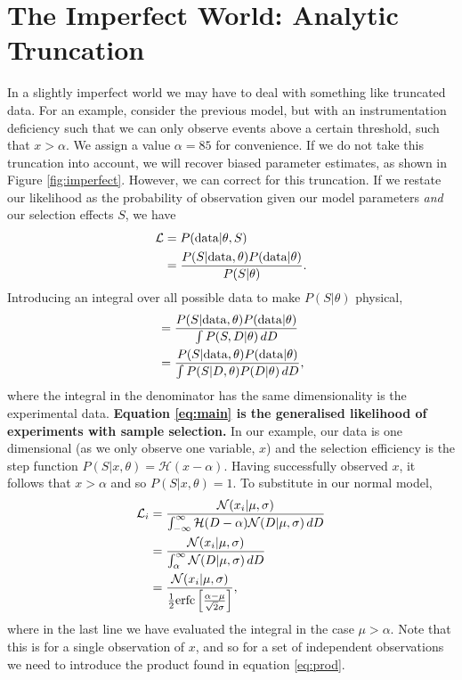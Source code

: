 \documentclass[a4paper,fleqn,usenatbib]{mnras}
\begin{document}
\section{The Imperfect World: Analytic Truncation}
\label{sec:imperfect}
In a slightly imperfect world we may have to deal with something like truncated data. For an example, consider the previous model, but with an instrumentation deficiency such that we can only observe events above a certain threshold, such that $x > \alpha$. We assign a value $\alpha=85$ for convenience. If we do not take this truncation into account, we will recover biased parameter estimates, as shown in Figure \ref{fig:imperfect}. However, we can correct for this truncation. If we restate our likelihood as the probability of observation given our model parameters \textit{and} our selection effects $S$, we have
\begin{align}
\mathcal{L} &= P({\rm data} | \theta, S)\\
&= \frac{P(S|{\rm data},\theta) P({\rm data}|\theta)}{P(S|\theta)}.
\end{align}
Introducing an integral over all possible data to make $P(S|\theta)$ physical,
\begin{align}
&= \frac{P(S|{\rm data},\theta) P({\rm data}|\theta)}{\int P(S, D|\theta)\, dD} \\
&= \frac{P(S|{\rm data},\theta) P({\rm data}|\theta)}{\int P(S | D, \theta) P(D|\theta)\, dD}, \label{eq:main}
\end{align}
where the integral in the denominator has the same dimensionality is the experimental data. \textbf{Equation \ref{eq:main} is the generalised likelihood of experiments with sample selection.} In our example, our data is one dimensional (as we only observe one variable, $x$) and the selection efficiency is the step function $P(S|x,\theta) = \mathcal{H}(x - \alpha)$. Having successfully observed $x$, it follows that $x > \alpha$ and so $P(S|x,\theta) = 1$. To substitute in our normal model,
\begin{align}
\mathcal{L}_i &= \frac{ \mathcal{N}(x_i|\mu, \sigma)}{\int_{-\infty}^\infty \mathcal{H}(D - \alpha) \mathcal{N}(D|\mu, \sigma)\, dD} \\
&= \frac{ \mathcal{N}(x_i|\mu, \sigma)}{\int_{\alpha}^\infty \mathcal{N}(D|\mu, \sigma)\, dD} \\
&= \frac{ \mathcal{N}(x_i|\mu, \sigma)}{\frac{1}{2} {\rm erfc}\left[ \frac{\alpha - \mu}{\sqrt{2}\sigma} \right]}, 
\end{align}
where in the last line we have evaluated the integral in the case $\mu > \alpha$. Note that this is for a single observation of $x$, and so for a set of independent observations we need to introduce the product found in equation \eqref{eq:prod}. 
\end{document}

